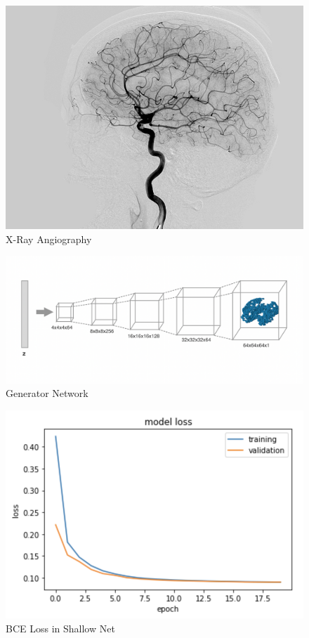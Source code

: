 \documentclass[conference, 10pt]{IEEEtran}
\begin{document}
\begin{figure}[h]
    \centering
    \includegraphics[scale=0.25]{figure_2.jpg}
    \caption{X-Ray Angiography}
\end{figure}
\begin{figure}[h]
    \centering
    \includegraphics[scale=0.15]{figure_3.png}
    \caption{Generator Network}
\end{figure}
\begin{figure}[h]
    \centering
    \includegraphics[scale=0.3]{shallow_loss.png}
    \caption{BCE Loss in Shallow Net}
\end{figure}
\end{document}
